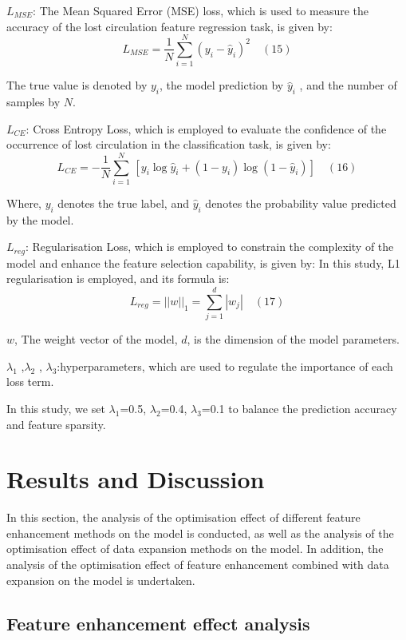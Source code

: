 \documentclass[journal,article,submit,pdftex,moreauthors]{Definitions/mdpi}
\begin{document}
\( L _ { M S E } \): The Mean Squared Error (MSE) loss, which is used to measure the accuracy of the lost circulation feature regression task, is given by:
$$ L _ { M S E } = \frac { 1 } { N } \sum _ { i = 1 } ^ { N } ( y _ { i } - \widehat { y } _ { i } ) ^ { 2 }\quad (15)$$

The true value is denoted by \({ y } _ { i } \), the model prediction by \(\widehat { y } _ { i }\) , and the number of samples by \(N\).


\(L _ { CE}\): Cross Entropy Loss, which is employed to evaluate the confidence of the occurrence of lost circulation in the classification task, is given by:
\[{{L}_{CE}}=-\frac{1}{N}\underset{i=1}{\overset{N}{\mathop \sum }}\,\left[ {{y}_{i}}\log {{{\hat{y}}}_{i}}+(1-{{y}_{i}})\log (1-{{{\hat{y}}}_{i}}) \right]\quad (16)\]

Where, \({y}_{i}\) denotes the true label, and \({\hat{y}}_{i}\) denotes the probability value predicted by the model.

\({L}_{reg
}\): Regularisation Loss, which is employed to constrain the complexity of the model and enhance the feature selection capability, is given by: In this study, L1 regularisation is employed, and its formula is:
$$ L _ { r e g } = | | w | | _ { 1 } = \sum _ { j = 1 } ^ { d } | w _ { j } |\quad (17)$$

\(w\), The weight vector of the model, \(d\), is the dimension of the model parameters.

\({{\lambda }_{1}}\) ,\({{\lambda }_{2}}\) , \({{\lambda }_{3}}\):hyperparameters, which are used to regulate the importance of each loss term. 

In this study, we set \({{\lambda }_{1}}\)=0.5, \({{\lambda }_{2}}\)=0.4, \({{\lambda }_{3}}\)=0.1 to balance the prediction accuracy and feature sparsity.

\section{Results and Discussion}

In this section, the analysis of the optimisation effect of different feature enhancement methods on the model is conducted, as well as the analysis of the optimisation effect of data expansion methods on the model. In addition, the analysis of the optimisation effect of feature enhancement combined with data expansion on the model is undertaken.

\subsection{Feature enhancement effect analysis}
\end{document}
